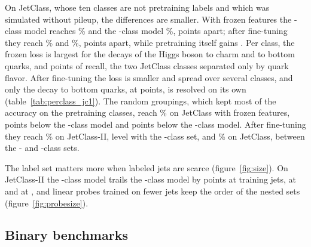 On JetClass, whose ten classes are not pretraining labels and which was simulated without pileup, the differences are
smaller.
With frozen features the \Kfull-class model reaches \VLpJcOneFull\% and the \Kcoarse-class model \VLpJcOneCoarse\%,
\RevDLpJcOneCoarse{} points apart; after fine-tuning they reach \VFtJcOneFull\% and \VFtJcOneCoarse\%,
\RevDFtJcOneCoarse{} points apart, while pretraining itself gains \VDFtJcOneGain.
Per class, the frozen loss is largest for the decays of the Higgs boson to charm and to bottom quarks, \VDLpRecallHcc{}
and \VDLpRecallHbb{} points of recall, the two JetClass classes separated only by quark flavor.
After fine-tuning the loss is smaller and spread over several classes, and only the decay to bottom quarks, at
\VDFtRecallHbb{} points, is resolved on its own (table~\ref{tab:perclass_jc1}).
The random groupings, which kept most of the accuracy on the pretraining classes, reach \VLpJcOneRand\% on JetClass
with frozen features, \VDLpJcOneRand{} points below the \Kfull-class model and \RevDLpJcOneRandCoarse{} points below the
\Kcoarse-class model.
After fine-tuning they reach \VFtJcTwoRand\% on JetClass-II, level with the \Kmid-class set, and \VFtJcOneRand\% on
JetClass, between the \Kmid- and \Kcoarse-class sets.

The label set matters more when labeled jets are scarce (figure~\ref{fig:size}).
On JetClass-II the \Kcoarse-class model trails the \Kfull-class model by \VDFtJcTwoCoarseSmallest{} points at
\FtSizeEFour{} training jets, \VDFtJcTwoCoarseSmaller{} at \FtSizeEFive{} and \VDFtJcTwoCoarse{} at \FtSizeESix, and
linear probes trained on fewer jets keep the order of the nested sets (figure~\ref{fig:probesize}).


\subsection{Binary benchmarks}\label{sec:binary}

